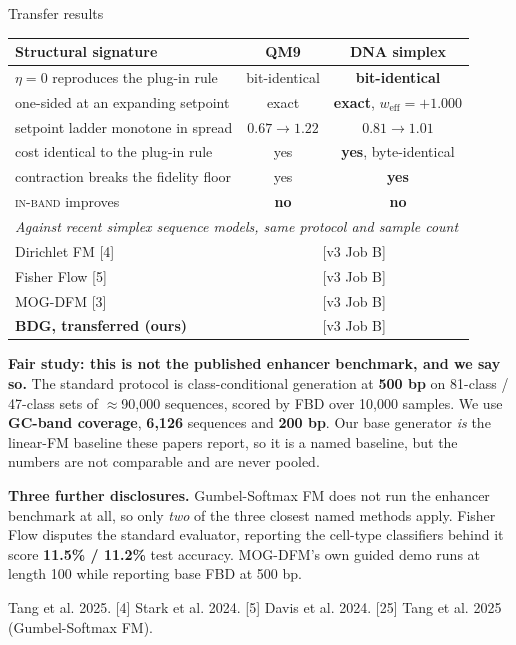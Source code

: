 \documentclass[aspectratio=169,10pt]{beamer}
\newcommand{\theslidelabel}{}
\newcommand{\lbl}[1]{\renewcommand{\theslidelabel}{#1}}
\newcommand{\srcs}[1]{\vfill{\raggedleft\color{grayt}\fontsize{4.9}{5.6}\selectfont #1\par}}
\newcommand{\TODO}[1]{\textcolor{accent}{\scriptsize[#1]}}
\newcommand{\weff}{w_{\mathrm{eff}}}
\newcommand{\ib}{\textsc{in-band}}
\begin{document}
\lbl{3b}
\begin{frame}[shrink=15]{Transfer results}
  \centering
  {\small
  \begin{tabular}{lcc}
    \toprule
    Structural signature & QM9 & DNA simplex \\
    \midrule
    $\eta{=}0$ reproduces the plug-in rule & bit-identical & \textbf{bit-identical} \\
    one-sided at an expanding setpoint & exact & \textbf{exact}, $\weff{=}{+}1.000$ \\
    setpoint ladder monotone in spread & $0.67\to1.22$ & $0.81\to1.01$ \\
    cost identical to the plug-in rule & yes & \textbf{yes}, byte-identical \\
    contraction breaks the fidelity floor & yes & \textbf{yes} \\
    \ib{} improves & \textbf{no} & \textbf{no} \\
    \midrule
    \multicolumn{3}{l}{\emph{Against recent simplex sequence models, same protocol and sample count}}\\
    Dirichlet FM [4] & \multicolumn{2}{c}{\TODO{v3 Job B}} \\
    Fisher Flow [5] & \multicolumn{2}{c}{\TODO{v3 Job B}} \\
    MOG-DFM [3] & \multicolumn{2}{c}{\TODO{v3 Job B}} \\
    \textbf{BDG, transferred (ours)} & \multicolumn{2}{c}{\TODO{v3 Job B}} \\
    \bottomrule
  \end{tabular}}

  \medskip
  \raggedright
  \textbf{Fair study: this is not the published enhancer benchmark, and we say so.}
  The standard protocol is class-conditional generation at \textbf{500 bp} on
  81-class / 47-class sets of $\approx$90{,}000 sequences, scored by FBD over
  10{,}000 samples. We use \textbf{GC-band coverage}, \textbf{6{,}126} sequences and
  \textbf{200 bp}. Our base generator \emph{is} the linear-FM baseline these papers
  report, so it is a named baseline, but the numbers are not comparable and are never
  pooled.

  \smallskip
  \textbf{Three further disclosures.} Gumbel-Softmax FM does not run the enhancer
  benchmark at all, so only \emph{two} of the three closest named methods apply.
  Fisher Flow disputes the standard evaluator, reporting the cell-type classifiers
  behind it score \textbf{11.5\% / 11.2\%} test accuracy. MOG-DFM's own guided demo
  runs at length 100 while reporting base FBD at 500 bp.

  \srcs{[3] Tang et al. 2025. [4] Stark et al. 2024. [5] Davis et al. 2024.
        [25] Tang et al. 2025 (Gumbel-Softmax FM).}
\end{frame}
\end{document}
